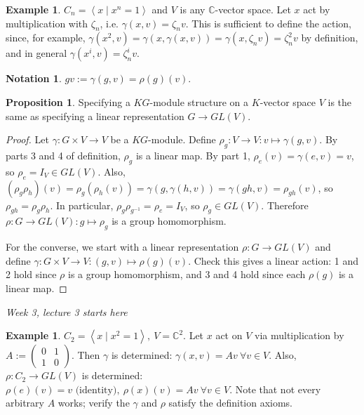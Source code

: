 \documentclass[a4paper]{article}
\newcommand{\la}{\left\langle}
\newcommand{\ra}{\right\rangle}
\newcommand{\C}{\mathbb{C}}
\theoremstyle{definition}
\newtheorem{prop}[defn]{Proposition}
\newtheorem{example}[defn]{Example}
\newtheorem*{notation}{Notation}
\begin{document}
\begin{example}
$C_n=\la x\mid x^n=1\ra$ and $V$ is any $\C$-vector space. Let $x$ act by multiplication with $\zeta_n$, i.e. $\gamma(x,v)=\zeta_nv$. This is sufficient to define the action, since, for example, $\gamma(x^2,v)=\gamma(x,\gamma(x,v))=\gamma(x,\zeta_nv)=\zeta_n^2v$ by definition, and in general $\gamma(x^i,v)=\zeta_n^i v$.
\end{example}

\begin{notation}
$gv:=\gamma(g,v)=\rho(g)(v)$.
\end{notation}

\begin{prop}
Specifying a $KG$-module structure on a $K$-vector space $V$ is the same as specifying a linear representation $G\rightarrow GL(V)$.
\end{prop}
\begin{proof}
Let $\gamma:G\times V\rightarrow V$ be a $KG$-module. Define $\rho_g:V\rightarrow V:v\mapsto \gamma(g,v)$. By parts 3 and 4 of definition, $\rho_g$ is a linear map. By part 1, $\rho_e(v)=\gamma(e,v)=v$, so $\rho_e=I_V\in GL(V)$. Also, $(\rho_g \rho_h)(v)=\rho_g(\rho_h(v))=\gamma(g,\gamma(h,v))=\gamma(gh,v)=\rho_{gh}(v)$, so $\rho_{gh}=\rho_g\rho_h$. In particular, $\rho_g\rho_{g^{-1}}=\rho_e=I_V$, so $\rho_g\in GL(V)$. Therefore $\rho:G\rightarrow GL(V):g\mapsto \rho_g$ is a group homomorphism.

For the converse, we start with a linear representation $\rho:G\rightarrow GL(V)$ and define $\gamma:G\times V\rightarrow V:(g,v)\mapsto \rho(g)(v)$. Check this gives a linear action: 1 and 2 hold since $\rho$ is a group homomorphism, and 3 and 4 hold since each $\rho(g)$ is a linear map.
\end{proof}

\begin{flushright}
\textit{Week 3, lecture 3 starts here}
\end{flushright}

\begin{example}
$C_2=\la x\mid x^2=1\ra,\ V=\C^2$. Let $x$ act on $V$ via multiplication by $A:=\begin{pmatrix}0&1\\1&0\end{pmatrix}$. Then $\gamma$ is determined: $\gamma(x,v)=Av\ \forall v\in V$. Also, $\rho:C_2\rightarrow GL(V)$ is determined: $\rho(e)(v)=v \text{ (identity)},\ \rho(x)(v)=Av \ \forall v\in V$. Note that not every arbitrary $A$ works; verify the $\gamma$ and $\rho$ satisfy the definition axioms.
\end{example}
\end{document}
